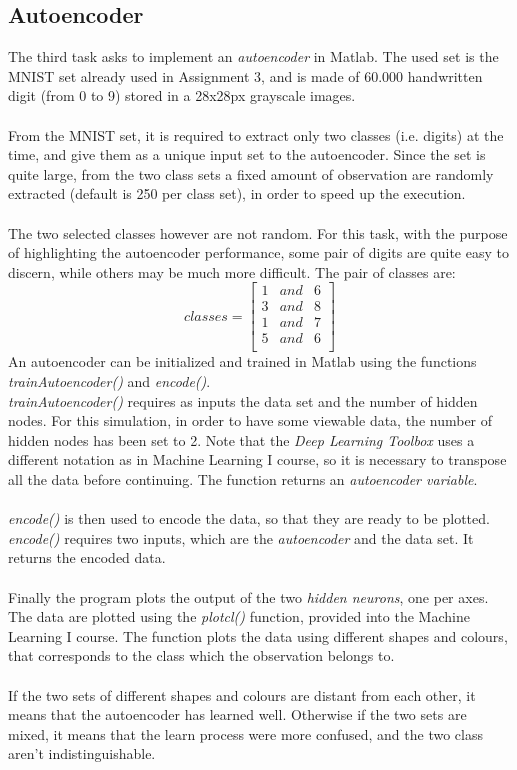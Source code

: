 \documentclass[10pt]{article}
\begin{document}
\subsection{Autoencoder}
The third task asks to implement an \textit{autoencoder} in Matlab.
The used set is the MNIST set already used in Assignment 3,
and is made of 60.000 handwritten digit (from 0 to 9) stored
in a 28x28px grayscale images.
\\\\
From the MNIST set, it is required to extract only two
classes (i.e. digits) at the time, and give them as a unique
input set to the autoencoder. Since the set is quite large, from
the two class sets a fixed amount of observation are randomly
extracted (default is 250 per class set), in order to speed up
the execution.
\\\\
The two selected classes however are not random. For
this task, with the purpose of highlighting the autoencoder
performance, some pair of digits are quite easy to discern, while others may be much more difficult. The pair of classes
are:
\begin{equation}
    \textit{classes} =\begin{bmatrix}
            1&\textit{and}&6\\
            3 &\textit{and} &8\\
            1& \textit{and}& 7\\
            5& \textit{and} &6\\
        \end{bmatrix}
\end{equation}
An autoencoder can be initialized and trained in Matlab
using the functions \textit{trainAutoencoder()} and \textit{encode()}.\\
\textit{trainAutoencoder()} requires as inputs the data set and the
number of hidden nodes. For this simulation, in order to have
some viewable data, the number of hidden nodes has been set
to 2. Note that the \textit{Deep Learning Toolbox} uses a different
notation as in Machine Learning I course, so it is necessary to
transpose all the data before continuing. The function returns
an \textit{autoencoder variable}.
\\\\
\textit{encode()} is then used to encode the data, so that they are
ready to be plotted. \textit{encode()} requires two inputs, which are
the \textit{autoencoder} and the data set. It returns the encoded data.
\\\\
Finally the program plots the output of the two \textit{hidden neurons}, one per axes. The data are plotted using the \textit{plotcl()}
function, provided into the Machine Learning I course. The
function plots the data using different shapes and colours, that
corresponds to the class which the observation belongs to.
\\\\
If the two sets of different shapes and colours are distant
from each other, it means that the autoencoder has learned
well. Otherwise if the two sets are mixed, it means that the
learn process were more confused, and the two class aren’t
indistinguishable.
\newpage
\end{document}
